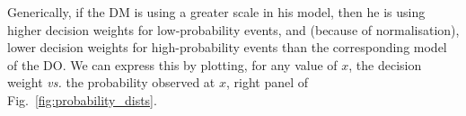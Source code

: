 \documentclass[a4paper, 12pt]{article}
\newcommand{\fref}[1]{Fig.~\ref{fig:#1}}
\newcommand{\Secref}[1]{Section~\ref{sec:#1}}
\newcommand{\ND}{\mathcal{N}} %
\begin{document}
%
%
%
%
%

Generically, if the DM is using a greater scale in his model, then he is using higher decision weights for low-probability events, and (because of normalisation), lower decision weights for high-probability events than the corresponding model of the DO. We can express this by plotting, for any value of $x$, the decision weight {\it vs.} the probability observed at $x$, right panel of \fref{probability_dists}.
\end{document}
